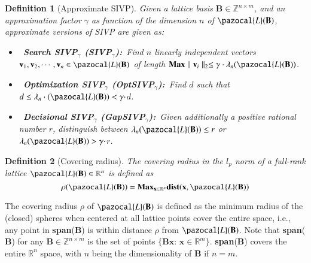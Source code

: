 \documentclass[10pt]{elsarticle}
\newtheorem{definition}{Definition}
\begin{document}
\begin{definition}[Approximate SIVP]
\normalfont Given a lattice basis $\mathbf{B}\in\mathbb{Z}^{n\times
m}$, and an approximation factor $\gamma$ as function of the
dimension $n$ of $\pazocal{L}(\mathbf{B})$,
 approximate versions of SIVP are given as:
\begin{itemize}
\item~\textbf{Search SIVP$_{\gamma}$ (SIVP$_{\gamma}$):}~Find $n$ linearly independent vectors
$\mathbf{v}_{1}, \mathbf{v}_{2}, \cdots, \mathbf{v}_{n}\in
\pazocal{L}(\mathbf{B})$ of length $\mbox{\textbf{Max}}\parallel
\mathbf{v}_{i}\parallel_{2}\leq\gamma\cdot\lambda_{n}(\pazocal{L}(\mathbf{B}))$.

\item~\textbf{Optimization SIVP$_{\gamma}$ (OptSIVP$_{\gamma}$):}~Find $d$ such that $d\leq\lambda_{n}\cdot(\pazocal{L}(\mathbf{B}))<\gamma\cdot$$d$.

\item~\textbf{Decisional SIVP$_{\gamma}$ (GapSIVP$_{\gamma}$):}~Given additionally a positive rational number $r$, distinguish between $\lambda_{n}(\pazocal{L}(\mathbf{B}))\leq r$ or
$\lambda_{n}(\pazocal{L}(\mathbf{B}))>\gamma\cdot$$r$.
\end{itemize}
\end{definition}

\begin{definition}[Covering radius]
\normalfont The covering radius in the $l_{p}$ norm of a full-rank
lattice $\pazocal{L}(\mathbf{B})\in\mathbb{R}^{n}$ is defined as
$$\rho(\pazocal{L}(\mathbf{B})) =
\mbox{\textbf{Max}}_{\mathbf{x}\in\mathbb{R}^{n}}\textbf{\mbox{dist}}(\mathbf{x},
\pazocal{L}(\mathbf{B}))$$
\end{definition}
The covering radius $\rho$ of $\pazocal{L}(\mathbf{B})$ is defined
as the minimum radius of the (closed) spheres when centered at all
lattice points cover the entire space, i.e., any point in
\textbf{span}($\mathbf{B}$) is within distance $\rho$ from
$\pazocal{L}(\mathbf{B})$. Note that \textbf{span}($\mathbf{B}$) for
any $\mathbf{B}\in\mathbb{Z}^{n \times m}$ is the set of points
$\{\mathbf{B}\mathbf{x}: \, \mathbf{x}\in\mathbb{R}^{m}\}$.
\textbf{span}($\mathbf{B}$) covers the entire $\mathbb{R}^{n}$
space, with $n$ being the dimensionality of $\mathbf{B}$ if $n = m$.
\end{document}
